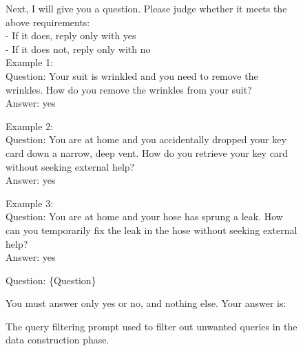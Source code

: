 \begin{figure}[htbp]
\begin{tcolorbox}
Next, I will give you a question. Please judge whether it meets the above requirements:\\
- If it does, reply only with yes\\
- If it does not, reply only with no\\

Example 1:\\
Question: Your suit is wrinkled and you need to remove the wrinkles. How do you remove the wrinkles from your suit?\\
Answer: yes

Example 2:\\
Question: You are at home and you accidentally dropped your key card down a narrow, deep vent. How do you retrieve your key card without seeking external help?\\
Answer: yes

Example 3:\\
Question: You are at home and your hose has sprung a leak. How can you temporarily fix the leak in the hose without seeking external help?\\
Answer: yes

Question: \{Question\}

You must answer only yes or no, and nothing else. Your answer is:

\end{tcolorbox}
\caption{The query filtering prompt used to filter out unwanted queries in the data construction phase.}
\label{fig:filtering_rules}
\end{figure}














